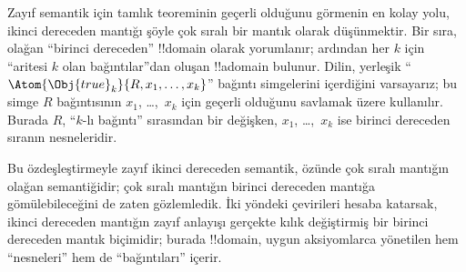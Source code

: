 \documentclass[../../../include/open-logic-section]{subfiles}
\begin{document}
Zayıf semantik için tamlık teoreminin geçerli olduğunu görmenin en kolay yolu,
ikinci dereceden mantığı şöyle çok sıralı bir mantık olarak düşünmektir. Bir
sıra, olağan ``birinci dereceden'' !!{domain} olarak yorumlanır; ardından her
$k$ için ``aritesi $k$ olan bağıntılar''dan oluşan !!a{domain} bulunur. Dilin,
yerleşik ``$\Atom{\Obj{true}_k}{R,x_1,\dots,x_k}$'' bağıntı simgelerini
içerdiğini varsayarız; bu simge $R$ bağıntısının $x_1$, \dots,~$x_k$ için geçerli
olduğunu savlamak üzere kullanılır. Burada $R$, ``$k$-lı bağıntı'' sırasından
bir değişken, $x_1$, \dots,~$x_k$ ise birinci dereceden sıranın nesneleridir.

Bu özdeşleştirmeyle zayıf ikinci dereceden semantik, özünde çok sıralı mantığın
olağan semantiğidir; çok sıralı mantığın birinci dereceden mantığa
gömülebileceğini de zaten gözlemledik. İki yöndeki çevirileri hesaba katarsak,
ikinci dereceden mantığın zayıf anlayışı gerçekte kılık değiştirmiş bir birinci
dereceden mantık biçimidir; burada !!{domain}, uygun aksiyomlarca yönetilen hem
``nesneleri'' hem de ``bağıntıları'' içerir.
\end{document}
